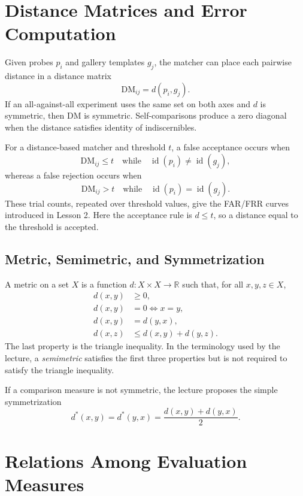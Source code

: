 \documentclass[11pt,a4paper,oneside]{report}
\begin{document}
\section{Distance Matrices and Error Computation}
\label{sec:distance-matrix-reliability}

Given probes $p_i$ and gallery templates $g_j$, the matcher can place each
pairwise distance in a distance matrix
\[
    \mathrm{DM}_{ij}=d(p_i,g_j).
\]
If an all-against-all experiment uses the same set on both axes and $d$ is
symmetric, then $\mathrm{DM}$ is symmetric.  Self-comparisons produce a zero
diagonal when the distance satisfies identity of indiscernibles.

For a distance-based matcher and threshold $t$, a false acceptance occurs when
\[
    \mathrm{DM}_{ij}\le t
    \quad\text{while}\quad
    \operatorname{id}(p_i)\neq \operatorname{id}(g_j),
\]
whereas a false rejection occurs when
\[
    \mathrm{DM}_{ij}>t
    \quad\text{while}\quad
    \operatorname{id}(p_i)= \operatorname{id}(g_j).
\]
These trial counts, repeated over threshold values, give the FAR/FRR curves
introduced in Lesson 2.  Here the acceptance rule is $d\le t$, so a distance
equal to the threshold is accepted.

\subsection{Metric, Semimetric, and Symmetrization}

A metric on a set $X$ is a function $d:X\times X\rightarrow\mathbb{R}$ such that,
for all $x,y,z\in X$,
\begin{align*}
    d(x,y)&\ge 0,\\
    d(x,y)&=0 \iff x=y,\\
    d(x,y)&=d(y,x),\\
    d(x,z)&\le d(x,y)+d(y,z).
\end{align*}
The last property is the triangle inequality.  In the terminology used by the
lecture, a \emph{semimetric} satisfies the first three properties but is not
required to satisfy the triangle inequality.

If a comparison measure is not symmetric, the lecture proposes the simple
symmetrization
\[
    d^{\ast}(x,y)=d^{\ast}(y,x)=\frac{d(x,y)+d(y,x)}{2}.
\]

\section{Relations Among Evaluation Measures}
\label{sec:roc-cmc-relation}
\end{document}
